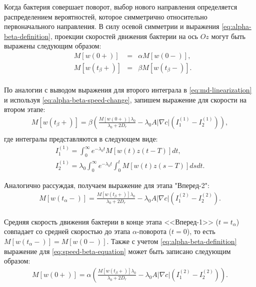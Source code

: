 Когда бактерия совершает поворот, выбор нового направления определяется распределением вероятностей, которое симметрично относительно первоначального направления. В силу осевой симметрии и выражения \cref{eq:alpha-beta-definition}, проекции скоростей движения бактерии на ось $Oz$ могут быть выражены следующим образом:
\begin{equation}
    \begin{aligned}
        &M[w(0+)]&=&\alpha M[w(0-)], \\
        &M[w(t_{\beta}+)]& = &\beta M[w(t_{\beta}-)]. \\
        \label{eq:alpha-beta-speed-change}
    \end{aligned}
\end{equation}

По аналогии с выводом выражения для второго интеграла в \cref{eq:md-linearization} и используя \cref{eq:alpha-beta-speed-change}, запишем выражение для скорости на втором этапе:
\begin{equation}
    \begin{aligned}
        M[w(t_{\beta}+)] = \beta \left ( \frac{M[w(0+)] \lambda_0}{\lambda_0 + 2 D_r} - \lambda_0 A |\nabla c| \left (I_1^{(1)} - I_2^{(1)} \right ) \right ), \\
        \label{eq:speed-beta-equation}
    \end{aligned}
\end{equation}
где интегралы представляются в следующем виде:
\begin{equation}
    \begin{aligned}
        I_1^{(1)}=\int_0^{\infty} e^{-\lambda_0t} M[w(t)z(t-T)]dt, \\
        I_2^{(1)}=\lambda_0 \int_0^{\infty} e^{-\lambda_0t} \int_0^{t} M[w(t)z(s-T)]ds dt.
        \label{eq:speed-integrals}
    \end{aligned}
\end{equation}

Аналогично рассуждая, получаем выражение для этапа "Вперед-2":
\begin{equation}
    \begin{aligned}
        M[w(t_{\alpha}-)] = \frac{M[w(t_{\beta}+)] \lambda_0}{\lambda_0 + 2 D_r} - \lambda_0 A |\nabla c| (I_1^{(2)} - I_2^{(2)}). \\
        \label{eq:speed-alpha-formula}
    \end{aligned}
\end{equation}

Средняя скорость движения бактерии в конце этапа <<Вперед-1>> ($t=t_{\alpha}$) совпадает со средней скоростью до этапа $\alpha$-поворота ($t=0$), то есть $M[w(t_{\alpha}-)]=M[w(0-)]$. Также с учетом \cref{eq:alpha-beta-definition} выражение для \cref{eq:speed-beta-equation} может быть записано следующим образом:
\begin{equation}
    \begin{aligned}
        M[w(0+)] = \alpha \left ( \frac{M[w(t_{\beta}+)] \lambda_0}{\lambda_0 + 2 D_r} - \lambda_0 A |\nabla c| \left (I_1^{(2)} - I_2^{(2)} \right ) \right ). \\
        \label{eq:speed-alpha-equation}
    \end{aligned}
\end{equation}

